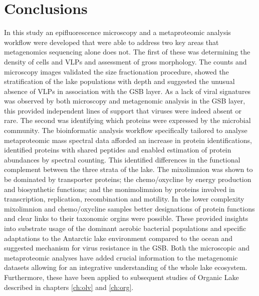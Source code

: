 \section{Conclusions}
In this study an epifluorescence microscopy and a metaproteomic analysis workflow were developed that were able to address two key areas that metagenomics sequencing alone does not.
The first of these was determining the density of cells and \acp{VLP} and assessment of gross morphology.
The counts and microscopy images validated the size fractionation procedure, showed the stratification of the lake populations with depth and suggested the unusual absence of \acp{VLP} in association with the \ac{GSB} layer.
As a lack of viral signatures was observed by both microscopy and metagenomic analysis in the \ac{GSB} layer, this provided independent lines of support that viruses were indeed absent or rare.
The second was identifying which proteins were expressed by the microbial community. 
The bioinformatic analysis workflow specifically tailored to analyse metaproteomic mass spectral data afforded an increase in protein identifications, identified proteins with shared peptides and enabled estimation of protein abundances by spectral counting.
This identified differences in the functional complement between the three strata of the lake.
The mixolimnion was shown to be dominated by transporter proteins; the chemo/oxycline by energy production and biosynthetic functions; and the monimolimnion by proteins involved in transcription, replication, recombination and motility.
In the lower complexity mixolimnion and chemo/oxycline samples better designations of protein functions and clear links to their taxonomic orgins were possible.
These provided insights into substrate usage of the dominant aerobic bacterial populations and specific adaptations to the Antarctic lake environment compared to the ocean and suggested mechanism for virus resistance in the \ac{GSB}.
Both the microscopic and metaproteomic analyses have added crucial information to the metagenomic datasets allowing for an integrative understanding of the whole lake ecosystem.
Furthermore, these have been applied to subsequent studies of Organic Lake described in chapters \ref{ch:olv} and \ref{ch:org}. 

